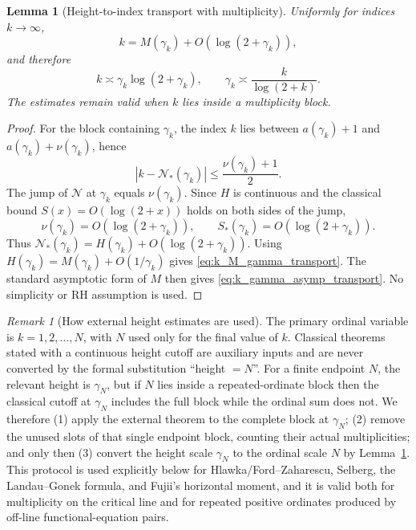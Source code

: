 \documentclass[11pt]{amsart}
\numberwithin{equation}{section}
\newtheorem{lemma}[theorem]{Lemma}
\theoremstyle{definition}
\theoremstyle{remark}
\newtheorem{remark}[theorem]{Remark}
\begin{document}
\begin{lemma}[Height-to-index transport with multiplicity]\label{lem:height_index_transport}
Uniformly for indices \(k\to\infty\),
\begin{equation}\label{eq:k_M_gamma_transport}
k=M(\gamma_k)+O(\log(2+\gamma_k)),
\end{equation}
and therefore
\begin{equation}\label{eq:k_gamma_asymp_transport}
k\asymp \gamma_k\log(2+\gamma_k),
\qquad
\gamma_k\asymp \frac{k}{\log(2+k)}.
\end{equation}
The estimates remain valid when \(k\) lies inside a multiplicity block.
\end{lemma}
\begin{proof}
For the block containing \(\gamma_k\), the index \(k\) lies between \(a(\gamma_k)+1\) and \(a(\gamma_k)+\nu(\gamma_k)\), hence
\[
|k-\mathcal N_*(\gamma_k)|\le \frac{\nu(\gamma_k)+1}{2}.
\]
The jump of \(\mathcal N\) at \(\gamma_k\) equals \(\nu(\gamma_k)\). Since \(H\) is continuous and the classical bound \(S(x)=O(\log(2+x))\) holds on both sides of the jump,
\begin{equation}\label{eq:ordinate_multiplicity_bound}
\nu(\gamma_k)=O(\log(2+\gamma_k)),
\qquad
S_*(\gamma_k)=O(\log(2+\gamma_k)).
\end{equation}
Thus \(\mathcal N_*(\gamma_k)=H(\gamma_k)+O(\log(2+\gamma_k))\). Using \(H(\gamma_k)=M(\gamma_k)+O(1/\gamma_k)\) gives \eqref{eq:k_M_gamma_transport}. The standard asymptotic form of \(M\) then gives \eqref{eq:k_gamma_asymp_transport}. No simplicity or RH assumption is used.
\end{proof}

\begin{remark}[How external height estimates are used]\label{rem:height_to_index_protocol}
The primary ordinal variable is \(k=1,2,\ldots,N\), with \(N\) used only for the final value of \(k\). Classical theorems stated with a continuous height cutoff are auxiliary inputs and are never converted by the formal substitution ``height \(=N\)''. For a finite endpoint \(N\), the relevant height is \(\gamma_N\), but if \(N\) lies inside a repeated-ordinate block then the classical cutoff at \(\gamma_N\) includes the full block while the ordinal sum does not. We therefore (1) apply the external theorem to the complete block at \(\gamma_N\); (2) remove the unused slots of that single endpoint block, counting their actual multiplicities; and only then (3) convert the height scale \(\gamma_N\) to the ordinal scale \(N\) by Lemma~\ref{lem:height_index_transport}. This protocol is used explicitly below for Hlawka/Ford--Zaharescu, Selberg, the Landau--Gonek formula, and Fujii's horizontal moment, and it is valid both for multiplicity on the critical line and for repeated positive ordinates produced by off-line functional-equation pairs.
\end{remark}
\end{document}
